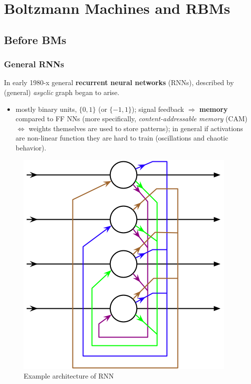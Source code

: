 \newpage
\section{Boltzmann Machines and RBMs}

\subsection{Before BMs\cite{rojas1996hopfield, hopfield, coursera_nn}}

\subsubsection{General RNNs}
In early 1980-x general \textbf{recurrent neural networks} (RNNs), described by (general) \emph{asyclic} graph began to arise.
\begin{itemize}
\item     mostly binary units, $\{0, 1\}$ (or $\{-1, 1\}$);
\gooditem signal feedback $\Rightarrow$ \textbf{memory} compared to FF NNs (more specifically, \emph{content-addressable memory} (CAM) $\Leftrightarrow$ weights themselves are used to store patterns);
\baditem  in general if activations are non-linear function they are hard to train (oscillations and chaotic behavior).
\end{itemize}

\begin{figure}[h]
\begin{mdframed}
\includegraphics[scale=0.4]{img/general_rnn.png}
\centering
\caption{Example architecture of RNN}
\label{fig:general_rnn}
\end{mdframed}
\end{figure}

